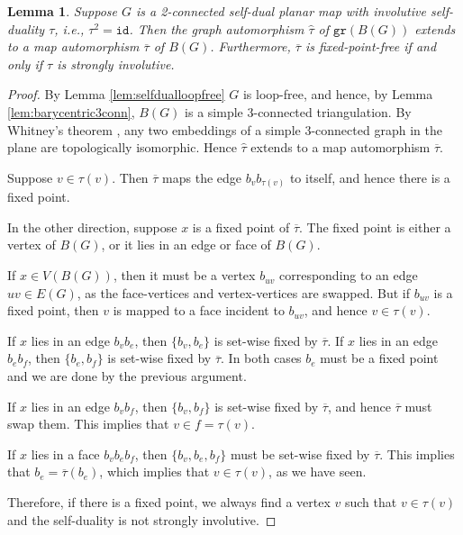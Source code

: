 \documentclass{article}
\newtheorem{lemma}[theorem]{Lemma}
\newcommand{\gr}{\mathtt{gr}}
\newcommand{\id}{\mathtt{id}}
\begin{document}
\begin{lemma}\label{lem:sisdotherdef}
    Suppose $G$ is a 2-connected self-dual planar map with involutive self-duality $\tau$, i.e., $\tau^2=\id$. Then the graph automorphism $\widehat{\tau}$ of $\gr(B(G))$ extends to a map automorphism $\overline{\tau}$ of $B(G)$. Furthermore, $\overline{\tau}$ is fixed-point-free if and only if $\tau$ is strongly involutive.
\end{lemma}
\begin{proof}
    By Lemma \ref{lem:selfdualloopfree} $G$ is loop-free, and hence, by Lemma \ref{lem:barycentric3conn}, $B(G)$ is a simple  3-connected triangulation. By Whitney's theorem \cite{whitney19332}, any two embeddings of a simple $3$-connected graph in the plane are topologically isomorphic. Hence $\widehat{\tau}$ extends to a map automorphism $\overline{\tau}$.
    
    Suppose $v\in \tau(v)$. Then $\overline{\tau}$ maps the edge $b_vb_{\tau(v)}$ to itself, and hence there is a fixed point. 

    In the other direction, suppose $x$ is a fixed point of $\overline{\tau}$. The fixed point is either a vertex of $B(G)$, or it lies in an edge or face of $B(G)$.
    
    If $x\in V(B(G))$, then it must be a vertex $b_{uv}$ corresponding to an edge $uv\in E(G)$, as the face-vertices and vertex-vertices are swapped. But if $b_{uv}$ is a fixed point, then $v$ is mapped to a face incident to $b_{uv}$, and hence $v\in \tau(v)$.

    If $x$ lies in an edge $b_vb_e$, then $\{b_v,b_e\}$ is set-wise fixed by $\overline{\tau}$. If $x$ lies in an edge $b_eb_f$, then $\{b_e,b_f\}$ is set-wise fixed by $\overline{\tau}$. In both cases $b_e$ must be a fixed point and we are done by the previous argument. 

    If $x$ lies in an edge $b_vb_f$, then $\{b_v,b_f\}$ is set-wise fixed by $\overline{\tau}$, and hence  $\overline{\tau}$ must swap them. This implies that $v\in f=\tau(v).$

    If $x$ lies in a face $b_vb_eb_f$, then $\{b_v,b_e,b_f\}$ must be set-wise fixed by $\overline{\tau}$. This implies that $b_e=\overline{\tau}(b_e)$, which implies that $v\in \tau(v)$, as we have seen. 

    Therefore, if there is a fixed point, we always find a vertex $v$ such that $v\in\tau(v)$ and the self-duality is not strongly involutive.
    
    
    
\end{proof}
\end{document}
